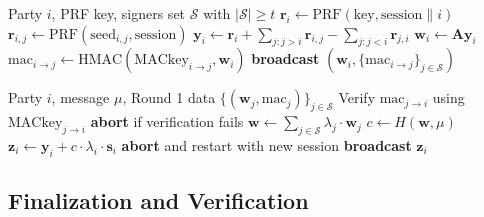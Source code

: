 \begin{algorithm}[H]
\caption{Corona Signing --- Round 1 (Message-Independent)}
\label{alg:sign-r1}
\begin{algorithmic}[1]
\Require Party $i$, PRF key, signers set $\mathcal{S}$ with $|\mathcal{S}| \geq t$
\State {}
\State $\mathbf{r}_i \gets \text{PRF}(\text{key}, \text{session} \| i)$ 
    \State $\mathbf{r}_{i,j} \gets \text{PRF}(\text{seed}_{i,j}, \text{session})$ 
\EndFor
\State $\mathbf{y}_i \gets \mathbf{r}_i + \sum_{j : j > i} \mathbf{r}_{i,j} - \sum_{j : j < i} \mathbf{r}_{j,i}$
\State $\mathbf{w}_i \gets \mathbf{A} \mathbf{y}_i$ 
\State {}
    \State $\text{mac}_{i \to j} \gets \text{HMAC}(\text{MACkey}_{i \to j}, \mathbf{w}_i)$
\EndFor
\State \textbf{broadcast} $(\mathbf{w}_i, \{\text{mac}_{i \to j}\}_{j \in \mathcal{S}})$
\end{algorithmic}
\end{algorithm}

\begin{algorithm}[H]
\caption{Corona Signing --- Round 2 (Message-Dependent)}
\label{alg:sign-r2}
\begin{algorithmic}[1]
\Require Party $i$, message $\mu$, Round 1 data $\{(\mathbf{w}_j, \text{mac}_j)\}_{j \in \mathcal{S}}$
\State {}
    \State Verify $\text{mac}_{j \to i}$ using $\text{MACkey}_{j \to i}$
    \State \textbf{abort} if verification fails
\EndFor
\State $\mathbf{w} \gets \sum_{j \in \mathcal{S}} \lambda_j \cdot \mathbf{w}_j$ 
\State $c \gets H(\mathbf{w}, \mu)$ 
\State $\mathbf{z}_i \gets \mathbf{y}_i + c \cdot \lambda_i \cdot \mathbf{s}_i$ 
\State {}
    \State \textbf{abort} and restart with new session
\EndIf
\State \textbf{broadcast} $\mathbf{z}_i$
\end{algorithmic}
\end{algorithm}

\subsection{Finalization and Verification}

